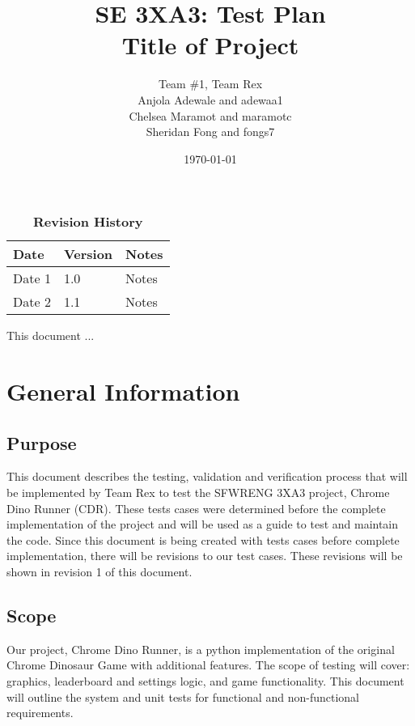 \documentclass[12pt, titlepage]{article}
\title{SE 3XA3: Test Plan\\Title of Project}
\author{Team \#1, Team Rex
	\\ Anjola Adewale and adewaa1
	\\ Chelsea Maramot and maramotc
	\\ Sheridan Fong and fongs7
}
\date{\today}
\begin{document}
	
	\maketitle
	
	\tableofcontents
	\listoftables
	\listoffigures
	
	\begin{table}[bp]
		\caption{\bf Revision History}
		\begin{tabularx}{\textwidth}{p{3cm}p{2cm}X}
			\toprule {\bf Date} & {\bf Version} & {\bf Notes}\\
			\midrule
			Date 1 & 1.0 & Notes\\
			Date 2 & 1.1 & Notes\\
			\bottomrule
		\end{tabularx}
	\end{table}
	
	\newpage
	
	
	This document ...
	
	\section{General Information}
	
	\subsection{Purpose}
	This document describes the testing, validation and verification process that will be implemented by Team Rex to test the SFWRENG 3XA3 project, Chrome Dino Runner (CDR). These tests cases were determined before the complete implementation of the project and will be used as a guide to test and maintain the code. Since this document is being created with tests cases before complete implementation, there will be revisions to our test cases. These revisions will be shown in revision 1 of this document. 
	
	\subsection{Scope}
	Our project, Chrome Dino Runner, is a python implementation of the original Chrome Dinosaur Game with additional features. The scope of testing will cover: graphics, leaderboard and settings logic, and game functionality. This document will outline the system and unit tests for functional and non-functional requirements. 
	
\end{document}
